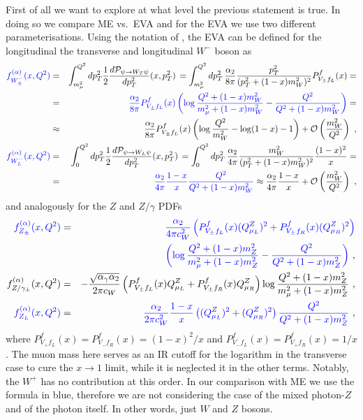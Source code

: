 \documentclass[a4paper,11pt]{article}
\begin{document}
First of all we want to explore at what level the previous statement is true. In doing so we compare  ME vs.~EVA and for the EVA we use two different parameterisations. Using the notation of \cite{Garosi:2023bvq}, the EVA can be defined for the longitudinal the transverse and longitudinal $W^-$ boson as 
\begin{eqnarray}
   { \color{blue} f_{W^-_\pm}^{(\alpha)}(x, Q^2)} &=& \int_{m_\mu^2}^{Q^2} d p_T^2 \frac{1}{2} \frac{d \mathcal{P}_{\psi \to W_T \psi}}{d p_T^2}(x, p_T^2) \, 
    = \int_{m_\mu^2}^{Q^2} d p_T^2 \, \frac{\alpha_2}{8 \pi} \frac{p_T^2}{(p_T^2 + (1-x) m_W^2)^2} P_{V_\pm f_L}^f(x) = \nonumber \\
    &=& { \color{blue}\frac{\alpha_2}{8 \pi} P_{V_\pm f_L}^f(x) \left( \log \frac{Q^2 + (1-x) m_W^2}{m_{\mu}^2 + (1-x) m_W^2} 
    - \frac{Q^2}{Q^2 + (1-x) m_W^2} \right) }= \nonumber \\
    &\approx& \frac{\alpha_2}{8 \pi} P_{V_\pm f_L}^f(x) \left( \log \frac{Q^2}{m_W^2} - \log(1-x) - 1\right) + \mathcal{O}\left( \frac{m_W^2}{Q^2} \right)~, \label{eq:EWA_WT} \\
%
    {\color{blue} f_{W^-_L}^{(\alpha)}(x, Q^2)} &=& \int_{0}^{Q^2} d p_T^2 \frac{1}{2} \frac{d \mathcal{P}_{\psi \to W_L \psi}}{d p_T^2} (x, p_T^2) \, 
    = \int_{0}^{Q^2} d p_T^2 \, \frac{\alpha_2}{4 \pi} \frac{m_W^2}{(p_T^2 + (1-x) m_W^2)^2} \frac{(1-x)^2}{x} = \nonumber \\
    &=& { \color{blue} \frac{\alpha_2}{4 \pi} \frac{1-x}{x}
    \frac{Q^2}{Q^2 + (1-x) m_W^2}}
    \approx \frac{\alpha_2}{4 \pi} \frac{1-x}{x} + \mathcal{O}\left( \frac{m_W^2}{Q^2} \right) ~,\label{eq:EWA_WL}
\end{eqnarray}
and analogously for the $Z$ and $Z/\gamma$ PDFs
\begin{eqnarray}
    {\color{blue}f_{Z_\pm}^{(\alpha)}(x, Q^2)} &=& 
    {\color{blue}\frac{\alpha_2}{4 \pi c_W^2} \left(P_{V_\pm f_L}^f(x) (Q^Z_{\mu_L})^2 + P_{V_\pm f_R}^f(x) (Q^Z_{\mu_R})^2 \right) }\nonumber \\
    && \quad {\color{blue}\left( \log \frac{Q^2 + (1-x) m_Z^2}{m_{\mu}^2 + (1-x) m_Z^2} 
    - \frac{Q^2}{Q^2 + (1-x) m_Z^2} \right)} ~, \label{eq:EWA_ZT} \\
%
    f_{Z/\gamma_\pm}^{(\alpha)}(x, Q^2) &=& 
    -\frac{\sqrt{\alpha_\gamma \alpha_2}}{2 \pi c_W} \left(P_{V_\pm f_L}^f(x) Q^Z_{\mu_L} + P_{V_\pm f_R}^f(x) Q^Z_{\mu_R} \right) \log \frac{Q^2 + (1-x) m_Z^2}{m_{\mu}^2 + (1-x) m_Z^2}  ~, \label{eq:EWA_ZgaT} \\
%
   {\color{blue} f_{Z_L}^{(\alpha)}(x, Q^2)} &=&
    {\color{blue}\frac{\alpha_2}{2 \pi c_W^2} \frac{1-x}{x} \left( (Q^Z_{\mu_L})^2 + (Q^Z_{\mu_R})^2\right) 
    \frac{Q^2}{Q^2 + (1-x) m_Z^2} }~,\label{eq:EWA_ZL}
\end{eqnarray}
where $P_{V_+ f_L}^f(x) = P_{V_- f_R}^f(x) = (1-x)^2 / x$ and $P_{V_- f_L}^f(x) = P_{V_+ f_R}^f(x) = 1 / x$.
The muon mass here serves as an IR cutoff for the logarithm in the transverse case to cure the $x\to 1$ limit, while it is neglected it in the other terms. Notably, the $W^+$ has no contribution at this order.
In our comparison with ME we use the formula in {\color{blue} blue}, therefore we are not considering the case of the mixed photon-$Z$ and of the photon itself.
In other words, just $W$ and $Z$ bosons.
\end{document}

